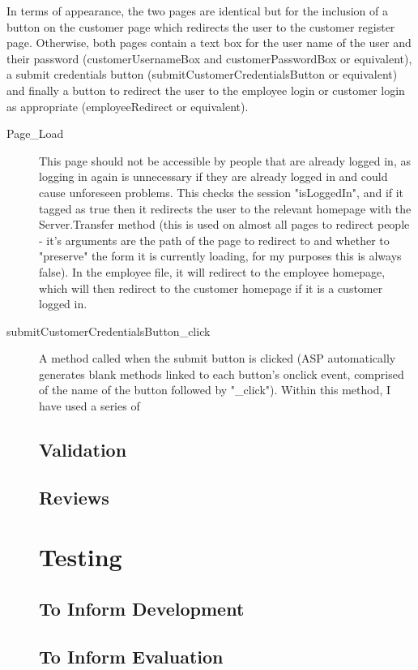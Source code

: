 ﻿\documentclass{article}
\begin{document}
    In terms of appearance, the two pages are identical but for the inclusion of a button on the customer page which redirects the user to the customer register page.
    Otherwise, both pages contain a text box for the user name of the user and their password (customerUsernameBox and customerPasswordBox or equivalent), a submit credentials button (submitCustomerCredentialsButton or equivalent) and finally a button to redirect the user to the employee login or customer login as appropriate (employeeRedirect or equivalent).
    \begin{description}
        \item[Page_Load] This page should not be accessible by people that are already logged in, as logging in again is unnecessary if they are already logged in and could cause unforeseen problems.
        This checks the session "isLoggedIn", and if it tagged as true then it redirects the user to the relevant homepage with the Server.Transfer method (this is used on almost all pages to redirect people - it's arguments are the path of the page to redirect to and whether to "preserve" the form it is currently loading, for my purposes this is always false).
        In the employee file, it will redirect to the employee homepage, which will then redirect to the customer homepage if it is a customer logged in.
        \item[submitCustomerCredentialsButton_click] A method called when the submit button is clicked (ASP automatically generates blank methods linked to each button's onclick event, comprised of the name of the button followed by "_click").
        Within this method, I have used a series of 
    \subsection{Validation}
    \subsection{Reviews}
    
    
    \section{Testing}
    \subsection{To Inform Development}
    \subsection{To Inform Evaluation}
    

\end{description}
\end{document}
